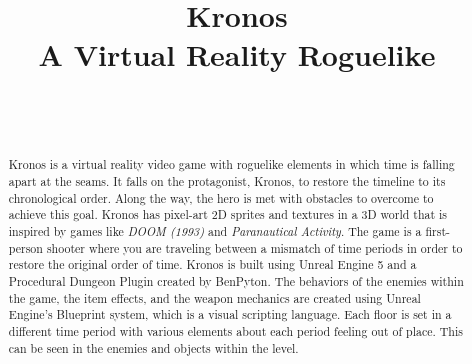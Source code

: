 \documentclass{sigchi}
\def\plaintitle{Kronos\\ \large A Virtual Reality Roguelike}
\begin{document}
\title{\plaintitle}

\author{%
  \\
  \\
}

\maketitle

\begin{abstract}
  Kronos is a virtual reality video game with roguelike elements in which time is falling apart at the seams. It falls on the protagonist, Kronos, to restore the timeline to its chronological order. Along the way, the hero is met with obstacles to overcome to achieve this goal. Kronos has pixel-art 2D sprites and textures in a 3D world that is inspired by games like \textit{DOOM (1993)} and \textit{Paranautical Activity}. The game is a first-person shooter where you are traveling between a mismatch of time periods in order to restore the original order of time. Kronos is built using Unreal Engine 5 and a Procedural Dungeon Plugin created by BenPyton. The behaviors of the enemies within the game, the item effects, and the weapon mechanics are created using Unreal Engine’s Blueprint system, which is a visual scripting language. Each floor is set in a different time period with various elements about each period feeling out of place. This can be seen in the enemies and objects within the level.
\end{abstract}


\end{document}
